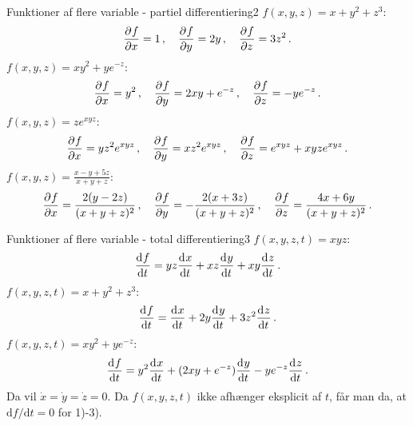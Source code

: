 \newpage
\begin{opgave}{Funktioner af flere variable - partiel differentiering}{2}
	\opg $f(x,y,z) = x+y^2+z^3$:
	\begin{align*}
	\pdif{x}{f} = 1 \, , \quad
	\pdif{y}{f} = 2y \, , \quad
	\pdif{z}{f} = 3z^2 \, .
	\end{align*}
	\opg $f(x,y,z)=xy^2+ye^{-z}$:
	\begin{align*}
	\pdif{x}{f} = y^2 \, , \quad
	\pdif{y}{f} = 2xy+e^{-z} \, , \quad
	\pdif{z}{f} = -ye^{-z} \, .
	\end{align*}
	\opg $f(x,y,z)=ze^{xyz}$:
	\begin{align*}
	\pdif{x}{f} = yz^2e^{xyz} \, , \quad
	\pdif{y}{f} = xz^2e^{xyz} \, , \quad
	\pdif{z}{f} = e^{xyz}+xyze^{xyz} \, .
	\end{align*}
	\opg $f(x,y,z) = \frac{x-y+5z}{x+y+z}$:
	\begin{align*}
	\pdif{x}{f} = \frac{2(y-2z)}{(x+y+z)^2} \, , \quad
	\pdif{y}{f} = -\frac{2(x+3z)}{(x+y+z)^2} \, , \quad
	\pdif{z}{f} = \frac{4x+6y}{(x+y+z)^2} \, .
	\end{align*}
\end{opgave}
\begin{opgave}{Funktioner af flere variable - total differentiering}{3}
	\opg $f(x,y,z,t) = xyz$:
	\begin{align*}
	\dif{t}{f} = yz\dif{t}{x} + xz\dif{t}{y} + xy\dif{t}{z} \, .
	\end{align*}
	\opg $f(x,y,z,t) = x+y^2+z^3$:
	\begin{align*}
	\dif{t}{f} = \dif{t}{x}+2y\dif{t}{y}+3z^2\dif{t}{z} \, .
	\end{align*}
	\opg $f(x,y,z,t) = xy^2+ye^{-z}$:
	\begin{align*}
	\dif{t}{f} = y^2\dif{t}{x}+(2xy+e^{-z})\dif{t}{y}-ye^{-z}\dif{t}{z} \, .
	\end{align*}
	\opg Da vil $\dot{x}=\dot{y}=\dot{z}=0$. Da $f(x,y,z,t)$ ikke afhænger eksplicit af $t$, får man da, at $\text{d}f/\text{d}t=0$ for 1)-3).
\end{opgave}
